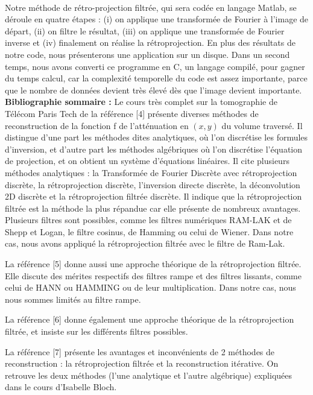 \documentclass[conference]{IEEEtran}
\begin{document}
\\
Notre méthode de rétro-projection filtrée, qui sera codée en langage Matlab, se déroule en quatre étapes : (i) on applique une transformée de Fourier à l’image de départ, (ii)  on filtre le résultat, (iii) on applique une transformée de Fourier inverse et (iv) finalement on réalise la rétroprojection. En plus des résultats de notre code, nous présenterons une application sur un disque. Dans un second temps, nous avons converti ce programme en C, un langage compilé, pour gagner du temps calcul, car la complexité temporelle du code est assez importante, parce que le nombre de données devient très élevé dès que l’image devient importante.
\\
\textbf{Bibliographie sommaire :}
Le cours très complet sur la tomographie de Télécom Paris Tech de la référence [4] présente diverses méthodes de reconstruction de la fonction f de l'atténuation en $(x,y)$ du volume traversé. Il distingue d’une part les méthodes dites analytiques, où l’on discrétise les formules d’inversion, et d'autre part les méthodes algébriques où l’on discrétise l’équation de projection, et on obtient un système d’équations linéaires. Il cite plusieurs méthodes analytiques : la Transformée de Fourier Discrète avec rétroprojection discrète, la rétroprojection discrète, l’inversion directe discrète, la déconvolution 2D discrète et la rétroprojection filtrée discrète. Il indique que la rétroprojection filtrée est la méthode la plus répandue car elle présente de nombreux avantages. Plusieurs filtres sont possibles, comme les filtres numériques RAM-LAK et de Shepp et Logan, le filtre cosinus, de Hamming ou celui de Wiener. Dans notre cas, nous avons appliqué la rétroprojection filtrée avec le filtre de Ram-Lak.
 
La référence [5] donne aussi une approche théorique de la rétroprojection filtrée. Elle discute des mérites respectifs des filtres rampe et des filtres lissants, comme celui de HANN ou HAMMING ou de leur multiplication. Dans notre cas, nous nous sommes limités au filtre rampe.
 
La référence [6] donne également une approche théorique de la rétroprojection filtrée, et insiste sur les différents filtres possibles.
 
La référence [7] présente les avantages et inconvénients de 2 méthodes de reconstruction : la rétroprojection filtrée et la reconstruction itérative. On retrouve les deux méthodes (l’une analytique et l’autre algébrique) expliquées dans le cours d’Isabelle Bloch.
 
\end{document}
